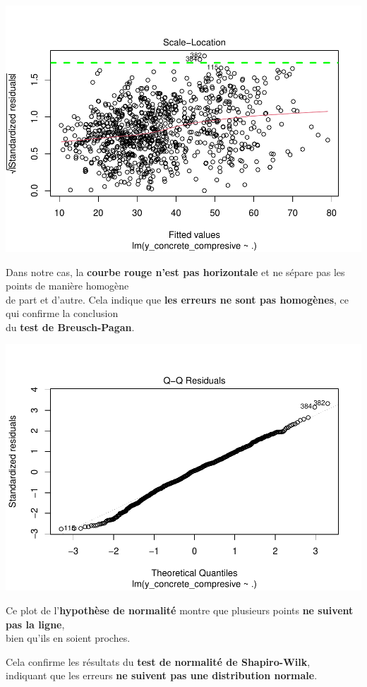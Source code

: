 \documentclass[
  12pt,
]{article}
\begin{document}
\includegraphics{rmd_final_files/figure-latex/unnamed-chunk-19-1.pdf}

Dans notre cas, la \textbf{courbe rouge n'est pas horizontale} et ne
sépare pas les points de manière homogène\\
de part et d'autre. Cela indique que \textbf{les erreurs ne sont pas
homogènes}, ce qui confirme la conclusion\\
du \textbf{test de Breusch-Pagan}.

\includegraphics{rmd_final_files/figure-latex/unnamed-chunk-20-1.pdf}

Ce plot de l'\textbf{hypothèse de normalité} montre que plusieurs points
\textbf{ne suivent pas la ligne},\\
bien qu'ils en soient proches.

Cela confirme les résultats du \textbf{test de normalité de
Shapiro-Wilk},\\
indiquant que les erreurs \textbf{ne suivent pas une distribution
normale}.
\end{document}
